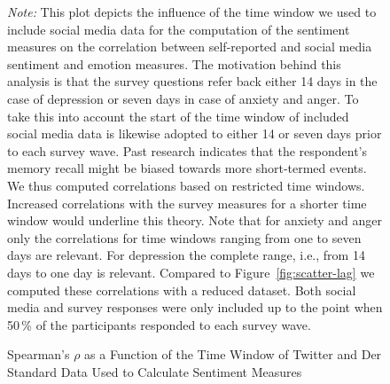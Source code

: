 \documentclass[
  english,
  jou,floatsintext]{apa7}
\begin{document}
\begin{figure}
\caption{Spearman's $\rho$ as a Function of the Time Window of Twitter and Der Standard Data Used to Calculate Sentiment Measures}\label{fig:scatter-lag-50}
\newline{}

\textit{Note:} This plot depicts the influence of the time window we used to include social media data for the computation of the sentiment measures on the correlation between self-reported and social media sentiment and emotion measures. The motivation behind this analysis is that the survey questions refer back either 14 days in the case of depression or seven days in case of anxiety and anger. To take this into account the start of the time window of included social media data is likewise adopted to either 14 or seven days prior to each survey wave. Past research indicates that the respondent's memory recall might be biased towards more short-termed events. We thus computed correlations based on restricted time windows. Increased correlations with the survey measures for a shorter time window would underline this theory. Note that for anxiety and anger only the correlations for time windows ranging from one to seven days are relevant. For depression the complete range, i.e., from 14 days to one day is relevant. Compared to Figure~\ref{fig:scatter-lag} we computed these correlations with a reduced dataset. Both social media and survey responses were only included up to the point when 50\,\% of the participants responded to each survey wave.
\end{figure}
\end{document}
